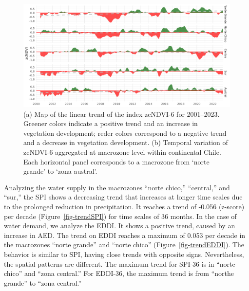 \documentclass[
  number,
  preprint,
  3p,
  onecolumn]{elsarticle}
\begin{document}
\begin{figure}[!ht]

{\centering \includegraphics{../output/figs/temporal_variation_zcNDVI6_macrozonas.png}

}

\caption{\label{fig-zcNDVI_var}(a) Map of the linear trend of the index
zcNDVI-6 for 2001--2023. Greener colors indicate a positive trend and an
increase in vegetation development; reder colors correspond to a
negative trend and a decrease in vegetation development. (b) Temporal
variation of zcNDVI-6 aggregated at macrozone level within continental
Chile. Each horizontal panel corresponds to a macrozone from `norte
grande' to `zona austral'.}

\end{figure}

Analyzing the water supply in the macrozones ``norte chico,''
``central,'' and ``sur,'' the SPI shows a decreasing trend that
increases at longer time scales due to the prolonged reduction in
precipitation. It reaches a trend of -0.056 (z-score) per decade
(Figure~\ref{fig-trendSPI}) for time scales of 36 months. In the case of
water demand, we analyze the EDDI. It shows a positive trend, caused by
an increase in AED. The trend on EDDI reaches a maximum of 0.053 per
decade in the macrozones ``norte grande'' and ``norte chico''
(Figure~\ref{fig-trendEDDI}). The behavior is similar to SPI, having
close trends with opposite signs. Nevertheless, the spatial patterns are
different. The maximum trend for SPI-36 is in ``norte chico'' and ``zona
central.'' For EDDI-36, the maximum trend is from ``northe grande'' to
``zona central.''
\end{document}
